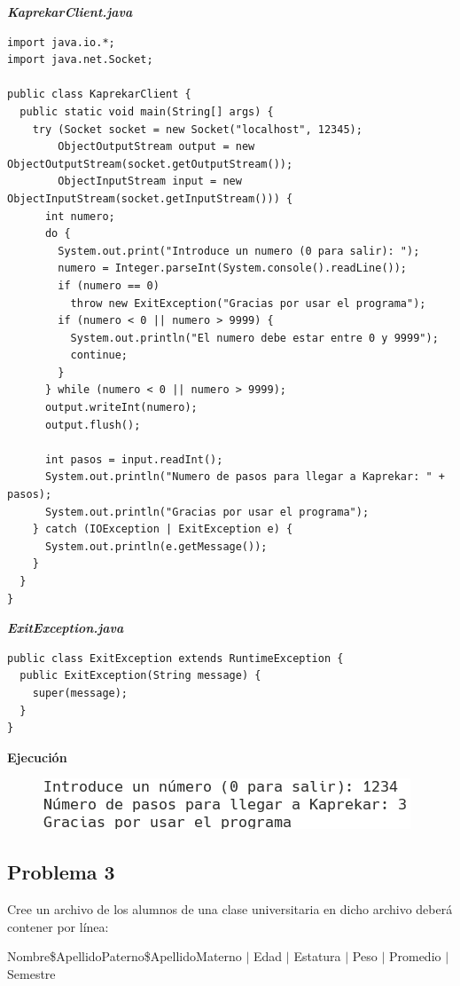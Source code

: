 \documentclass[11pt, twocolumn]{article}
\begin{document}
  \textit{\textbf{KaprekarClient.java}}
  \begin{lstlisting}
import java.io.*;
import java.net.Socket;

public class KaprekarClient {
  public static void main(String[] args) {
    try (Socket socket = new Socket("localhost", 12345);
        ObjectOutputStream output = new ObjectOutputStream(socket.getOutputStream());
        ObjectInputStream input = new ObjectInputStream(socket.getInputStream())) {
      int numero;
      do {
        System.out.print("Introduce un numero (0 para salir): ");
        numero = Integer.parseInt(System.console().readLine());
        if (numero == 0) 
          throw new ExitException("Gracias por usar el programa");
        if (numero < 0 || numero > 9999) {
          System.out.println("El numero debe estar entre 0 y 9999");
          continue;
        }
      } while (numero < 0 || numero > 9999);
      output.writeInt(numero);
      output.flush();

      int pasos = input.readInt();
      System.out.println("Numero de pasos para llegar a Kaprekar: " + pasos);
      System.out.println("Gracias por usar el programa");
    } catch (IOException | ExitException e) {
      System.out.println(e.getMessage());
    }
  }
}
  \end{lstlisting}

  \textit{\textbf{ExitException.java}}
  \begin{lstlisting}
public class ExitException extends RuntimeException {
  public ExitException(String message) {
    super(message);
  }
}
  \end{lstlisting}

  \textbf{Ejecución}
  \begin{figure}[h!]
    \centering
    \includegraphics[width=0.8\columnwidth]{P2.png}
  \end{figure}

  \subsection*{Problema 3}
  Cree un archivo de los alumnos de una clase universitaria en dicho archivo deberá contener por línea:
  
  Nombre\$ApellidoPaterno\$ApellidoMaterno $|$ Edad $|$ Estatura $|$ Peso $|$ Promedio $|$ Semestre
\end{document}
